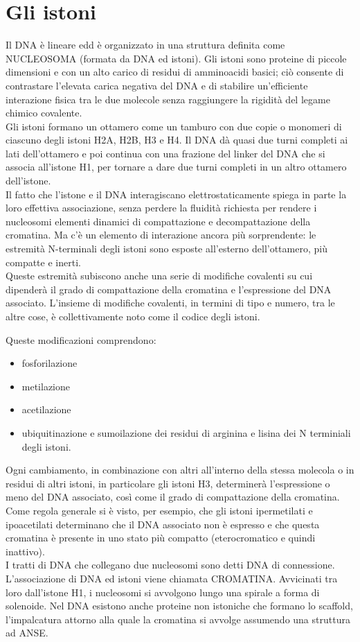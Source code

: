 \documentclass{article}
\begin{document}
\section{Gli istoni} Il DNA è lineare edd è organizzato in una struttura definita come NUCLEOSOMA (formata da DNA ed istoni).
Gli istoni sono proteine di piccole dimensioni e con un alto carico di residui di amminoacidi basici; ciò consente di contrastare l'elevata carica negativa del DNA e di stabilire un'efficiente interazione fisica tra le due molecole senza raggiungere la rigidità del legame chimico covalente. 
\\[1ex]
Gli istoni formano un ottamero come un tamburo con due copie o monomeri di ciascuno degli istoni H2A, H2B, H3 e H4. Il DNA dà quasi due turni completi ai lati dell'ottamero e poi continua con una frazione del linker del DNA che si associa all'istone H1, per tornare a dare due turni completi in un altro ottamero dell'istone.
\\[1ex]
Il fatto che l'istone e il DNA interagiscano elettrostaticamente spiega in parte la loro effettiva associazione, senza perdere la fluidità richiesta per rendere i nucleosomi elementi dinamici di compattazione e decompattazione della cromatina. 
Ma c'è un elemento di interazione ancora più sorprendente: le estremità N-terminali degli istoni sono esposte all'esterno dell'ottamero, più compatte e inerti.
\\[1ex]
Queste estremità subiscono anche una serie di modifiche covalenti su cui dipenderà il grado di compattazione della cromatina e l'espressione del DNA associato. L'insieme di modifiche covalenti, in termini di tipo e numero, tra le altre cose, è collettivamente noto come il codice degli istoni. 

Queste modificazioni comprendono:
\begin{itemize}
\item fosforilazione
\item metilazione
\item acetilazione
\item ubiquitinazione e sumoilazione dei residui di arginina e lisina dei N terminiali degli istoni.
\end{itemize}

Ogni cambiamento, in combinazione con altri all'interno della stessa molecola o in residui di altri istoni, in particolare gli istoni H3, determinerà l'espressione o meno del DNA associato, così come il grado di compattazione della cromatina.\\
Come regola generale si è visto, per esempio, che gli istoni ipermetilati e ipoacetilati determinano che il DNA associato non è espresso e che questa cromatina è presente in uno stato più compatto (eterocromatico e quindi inattivo). \\
I tratti di DNA che collegano due nucleosomi sono detti DNA di connessione. L'associazione di DNA ed istoni viene chiamata CROMATINA.
Avvicinati tra loro dall'istone H1, i nucleosomi si avvolgono lungo una spirale a forma di solenoide. Nel DNA esistono anche proteine non istoniche che formano lo scaffold, l'impalcatura attorno alla quale la cromatina si avvolge assumendo una struttura ad ANSE.\\
\end{document}
